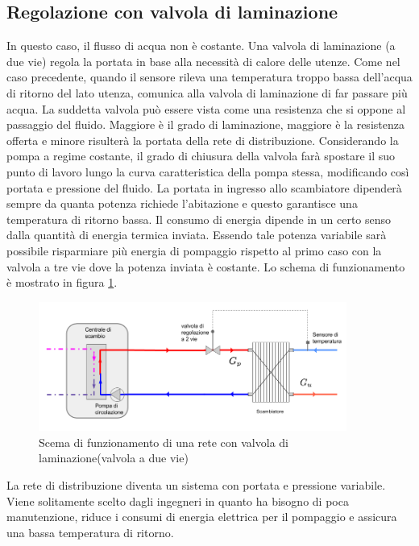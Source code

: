 \documentclass[laurea,oneside,11pt]{USiena_tesiLM}
\begin{document}
\subsection{Regolazione con valvola di laminazione}
\label{subsec:2vie}
In questo caso, il flusso di acqua non è costante. Una valvola di laminazione (a due vie) regola la portata in base alla necessità di calore delle utenze. 
Come nel caso precedente, quando il sensore rileva una temperatura troppo bassa dell'acqua di ritorno del lato utenza, comunica alla valvola di laminazione di far passare più acqua. 
La suddetta valvola può essere vista come una resistenza che si oppone al passaggio del fluido. Maggiore è il grado di laminazione, maggiore è la resistenza offerta e minore risulterà la portata della rete di distribuzione. Considerando la pompa a regime costante, il grado di chiusura della valvola farà spostare il suo punto di lavoro lungo la curva caratteristica della pompa stessa, modificando così portata e pressione del fluido.
La portata in ingresso allo scambiatore dipenderà sempre da quanta potenza richiede l'abitazione e questo garantisce una temperatura di ritorno bassa. 
Il consumo di energia dipende in un certo senso dalla quantità di energia termica inviata. Essendo tale potenza variabile sarà possibile risparmiare più energia di pompaggio rispetto al primo caso con la valvola a tre vie dove la potenza inviata è costante. Lo schema di funzionamento è mostrato in figura \ref{fig:2vie}.

\begin{figure}[!ht]
\centering
\includegraphics[width=0.9\textwidth]{figure/2vie}
\caption{Scema di funzionamento di una rete con valvola di laminazione(valvola a due vie)}
\label{fig:2vie}

\end{figure}

La rete di distribuzione diventa un sistema con portata e pressione variabile. Viene solitamente scelto dagli ingegneri in quanto ha bisogno di poca manutenzione, riduce i consumi di energia elettrica per il pompaggio e assicura una bassa temperatura di ritorno.
\end{document}
